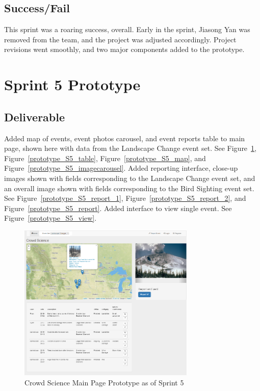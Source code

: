 \subsection{Success/Fail}
This sprint was a roaring success, overall. Early in the sprint, Jiasong Yan was removed from the team, and the project was adjusted accordingly. Project revisions went smoothly, and two major components added to the prototype.

\section{Sprint 5 Prototype}
\subsection{Deliverable}
Added map of events, event photos carousel, and event reports table to main page, shown here with data from the Landscape Change event set. See Figure~\ref{prototype_S5_main}, Figure~\ref{prototype_S5_table},  Figure~\ref{prototype_S5_map}, and  Figure~\ref{prototype_S5_imagecarousel}.  Added reporting interface, close-up images shown with fields corresponding to the Landscape Change event set, and an overall image shown with fields corresponding to the Bird Sighting event set. See Figure~\ref{prototype_S5_report_1}, Figure~\ref{prototype_S5_report_2}, and Figure~\ref{prototype_S5_report}. Added interface to view single event. See Figure~\ref{prototype_S5_view}.

\begin{figure}[tbh]
\begin{center}
\includegraphics[width=0.75\textwidth]{./figures/prototype_S5_main.png}
\end{center}
\caption{Crowd Science Main Page Prototype as of Sprint 5\label{prototype_S5_main}}
\end{figure}

